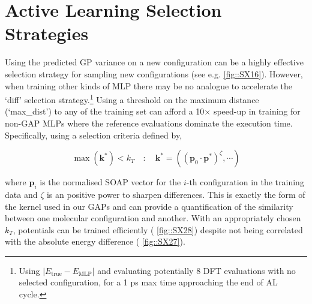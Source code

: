 \documentclass[11pt]{article}
\numberwithin{equation}{subsection}
\begin{document}
\clearpage
\section{Active Learning Selection Strategies}


Using the predicted GP variance on a new configuration can be a highly effective selection strategy for sampling new configurations (see e.g. \figurename{ \ref{fig::SX16}}). However, when training other kinds of MLP there may be no analogue to accelerate the `diff' selection strategy.\footnote{Using $|E_\text{true} - E_\text{MLP}|$ and evaluating potentially 8 DFT evaluations with no selected configuration, for a 1 ps max time approaching the end of AL cycle.} Using a threshold on the maximum distance (`max\_dist') to any of the training set can afford a 10$\times$ speed-up in training for non-GAP MLPs where the reference evaluations dominate the execution time. Specifically, using a selection criteria defined by,

\begin{equation}
	\max(\boldsymbol{k}^*) < k_T \quad : \quad \boldsymbol{k}^* = ((\boldsymbol{p}_0 \cdot \boldsymbol{p}^*)^\zeta, \cdots)
\end{equation}

where $\boldsymbol{p}_i$ is the normalised SOAP vector for the $i$-th configuration in the training data and $\zeta$ is an positive power to sharpen differences. This is exactly the form of the kernel used in our GAPs and can provide a quantification of the similarity between one molecular configuration and another. With an appropriately chosen $k_T$, potentials can be trained efficiently (\figurename{ \ref{fig::SX28}}) despite not being correlated with the absolute energy difference (\figurename{ \ref{fig::SX27}}). 
\end{document}
